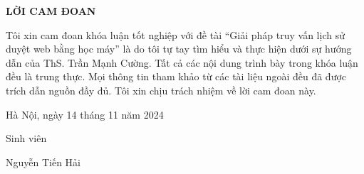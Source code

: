 \setcounter{page}{1}
\begin{center}
\textbf{\large{LỜI CAM ĐOAN}	}
\end{center}
Tôi xin cam đoan khóa luận tốt nghiệp với đề tài “Giải pháp truy vấn lịch sử duyệt web bằng học máy” là do tôi tự tay tìm hiểu và thực hiện dưới sự hướng dẫn của ThS. Trần Mạnh Cường. Tất cả các nội dung trình bày trong khóa luận đều là trung thực. Mọi thông tin tham khảo từ các tài liệu ngoài đều đã được trích dẫn nguồn đầy đủ. Tôi xin chịu trách nhiệm về lời cam đoan này.

\begin{flushright}
Hà Nội, ngày 14 tháng 11 năm 2024
\end{flushright}

\begin{changemargin}{11.5cm}{2cm}
Sinh viên
\\[2cm]
\end{changemargin}

\begin{changemargin}{11cm}{2cm}
Nguyễn Tiến Hải
\end{changemargin}